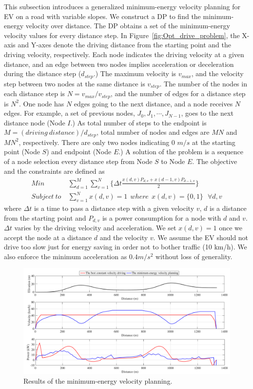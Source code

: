\documentclass{IEEEtran}
\begin{document}
This subsection introduces a generalized minimum-energy velocity planning for EV  on a road with variable slopes. We construct a DP to find the minimum-energy velocity over distance. The DP obtains a set of the minimum-energy velocity values for every distance step. In Figure~\ref{fig:Opt_drive_problem}, the X-axis and Y-axes denote the driving distance from the starting point and the driving velocity, respectively. Each node indicates the driving velocity at a given distance, and an edge between two nodes implies acceleration or deceleration during the distance step ($d_{step}$.) The maximum velocity is $v_{max}$, and the velocity step between two nodes at the same distance is $v_{step}$. The number of the nodes in each distance step is $N = v_{max} / v_{step}$, and the number of edges for a distance step is $N^2$. One node has $N$ edges going to the next distance, and a node receives $N$ edges. For example, a set of previous nodes, $J_0, J_1, \cdots, J_{N-1}$, goes to the next distance node (Node $I$.) As total number of steps to the endpoint is $M = (driving~distance) / d_{step}$, total number of nodes and edges are $MN$ and $MN^2$, respectively. There are only two nodes indicating 0 $m/s$ at the starting point (Node $S$) and endpoint (Node $E$.) A solution of the problem is a sequence of a node selection every distance step from Node $S$ to Node $E$. The objective and the constraints are defined as
%
\begin{align} %
Min ~& \sum_{d=1}^{M}\sum_{v=1}^{N}\{\Delta t \frac{x(d,v)P_{d,v} + x(d-1,v)P_{d-1,v}}{2}\} \label{eq:objective}\\
Subject~to ~& \sum_{v=1}^{N}x(d,v) = 1~~where~~x(d,v) = \{0, 1\} ~~~\forall d, v \nonumber
\end{align}
%
where $\Delta t$ is a time to pass a distance step with a given velocity $v$, $d$ is a distance from the starting point and $P_{d,v}$ is a power consumption for a node with $d$ and $v$. $\Delta t$ varies by the driving velocity and acceleration. We set $x(d,v)=1$ once we accept the node at a distance $d$ and the velocity $v$.  We assume the EV should not drive too slow just for energy saving in order not to bother traffic (10 km/h). We also enforce the minimum acceleration as $ 0.4 m/s^2$ without loss of generality. 

\begin{figure}	%
\centering
\includegraphics[width=1.0\hsize]{Figures/velocity_planning_road_Z.pdf}
\caption{Results of the minimum-energy velocity planning.}
\label{fig:no_deadline_trace}
\end{figure} 
\end{document}
